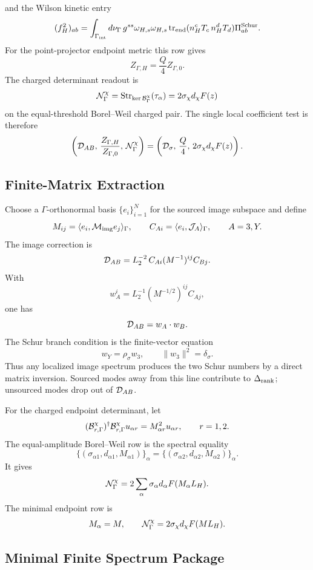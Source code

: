 \documentclass[11pt]{article}
\theoremstyle{definition}
\theoremstyle{remark}
\begin{document}
and the Wilson kinetic entry
\[
  (f_H^2)_{ab}
  =
  \int_{\Gamma_{\rm int}}d\nu_\Gamma\,
  g^{ss}\omega_{H,s}\omega_{H,s}\,
  {\rm tr}_{\rm end}(n_H^cT_c\,n_H^dT_d)\Pi_{ab}^{\rm Schur}.
\]
For the point-projector endpoint metric this row gives
\[
  Z_{\Gamma,H}=\frac Q4Z_{\Gamma,0}.
\]
The charged determinant readout is
\[
  {\cal N}_\Gamma^\chi
  =
  {\rm Str}_{\ker{\cal B}_\Gamma^\chi}
  (\tau_\alpha)
  =
  2\sigma_\chi d_\chi F(z)
\]
on the equal-threshold Borel--Weil charged pair.  The single local coefficient
test is therefore
\[
  \left(
  {\cal D}_{AB},\,
  \frac{Z_{\Gamma,H}}{Z_{\Gamma,0}},\,
  {\cal N}_\Gamma^\chi
  \right)
  =
  \left(
  {\cal D}_\sigma,\,
  \frac Q4,\,
  2\sigma_\chi d_\chi F(z)
  \right).
\]

\subsection{Finite-Matrix Extraction}

Choose a \(\Gamma\)-orthonormal basis
\(\{e_i\}_{i=1}^N\) for the sourced image subspace and define
\[
  M_{ij}=\langle e_i,{\cal M}_{\rm img}e_j\rangle_\Gamma,
  \qquad
  C_{Ai}=\langle e_i,{\cal J}_A\rangle_\Gamma ,
  \qquad A=3,Y .
\]
The image correction is
\[
  {\cal D}_{AB}
  =
  L_2^{-2}\,C_{Ai}(M^{-1})^{ij}C_{Bj}.
\]
With
\[
  w_A^i=L_2^{-1}(M^{-1/2})^{ij}C_{Aj},
\]
one has
\[
  {\cal D}_{AB}=w_A\cdot w_B .
\]
The Schur branch condition is the finite-vector equation
\[
  w_Y=\rho_\sigma w_3,
  \qquad
  \|w_3\|^2=\delta_\sigma .
\]
Thus any localized image spectrum produces the two Schur numbers by a direct
matrix inversion.  Sourced modes away from this line contribute to
\(\Delta_{\rm rank}\); unsourced modes drop out of \({\cal D}_{AB}\).

For the charged endpoint determinant, let
\[
  ({\cal B}_{r,\Gamma}^\chi)^\dagger
  {\cal B}_{r,\Gamma}^\chi u_{\alpha r}
  =
  M_{\alpha r}^2u_{\alpha r},
  \qquad r=1,2 .
\]
The equal-amplitude Borel--Weil row is the spectral equality
\[
  \{(\sigma_{\alpha1},d_{\alpha1},M_{\alpha1})\}_\alpha
  =
  \{(\sigma_{\alpha2},d_{\alpha2},M_{\alpha2})\}_\alpha .
\]
It gives
\[
  {\cal N}_\Gamma^\chi
  =
  2\sum_\alpha
  \sigma_\alpha d_\alpha
  F(M_\alpha L_H).
\]
The minimal endpoint row is
\[
  M_\alpha=M,\qquad
  {\cal N}_\Gamma^\chi=2\sigma_\chi d_\chi F(ML_H).
\]

\subsection{Minimal Finite Spectrum Package}
\end{document}
